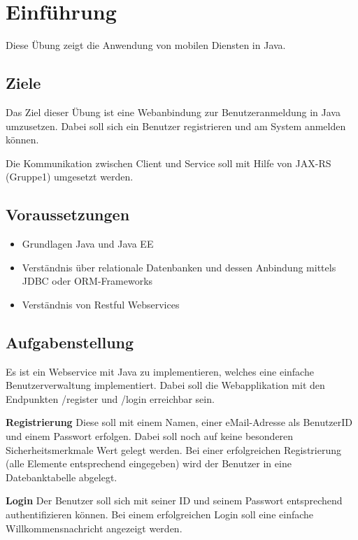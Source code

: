 
\section{Einführung}
Diese Übung zeigt die Anwendung von mobilen Diensten in Java.

\subsection{Ziele}

Das Ziel dieser Übung ist eine Webanbindung zur Benutzeranmeldung in Java umzusetzen. Dabei soll sich ein Benutzer registrieren und am System anmelden können.

Die Kommunikation zwischen Client und Service soll mit Hilfe von JAX-RS (Gruppe1) umgesetzt werden.

\subsection{Voraussetzungen}
	\begin{itemize}
		\item Grundlagen Java und Java EE
		\item Verständnis über relationale Datenbanken und dessen Anbindung mittels JDBC oder ORM-Frameworks
		\item Verständnis von Restful Webservices
	\end{itemize}

\subsection{Aufgabenstellung}

Es ist ein Webservice mit Java zu implementieren, welches eine einfache Benutzerverwaltung implementiert. Dabei soll die Webapplikation mit den Endpunkten /register und /login erreichbar sein.

\textbf{Registrierung}
Diese soll mit einem Namen, einer eMail-Adresse als BenutzerID und einem Passwort erfolgen. Dabei soll noch auf keine besonderen Sicherheitsmerkmale Wert gelegt werden. Bei einer erfolgreichen Registrierung (alle Elemente entsprechend eingegeben) wird der Benutzer in eine Datebanktabelle abgelegt.

\textbf{Login}
Der Benutzer soll sich mit seiner ID und seinem Passwort entsprechend authentifizieren können. Bei einem erfolgreichen Login soll eine einfache Willkommensnachricht angezeigt werden.


